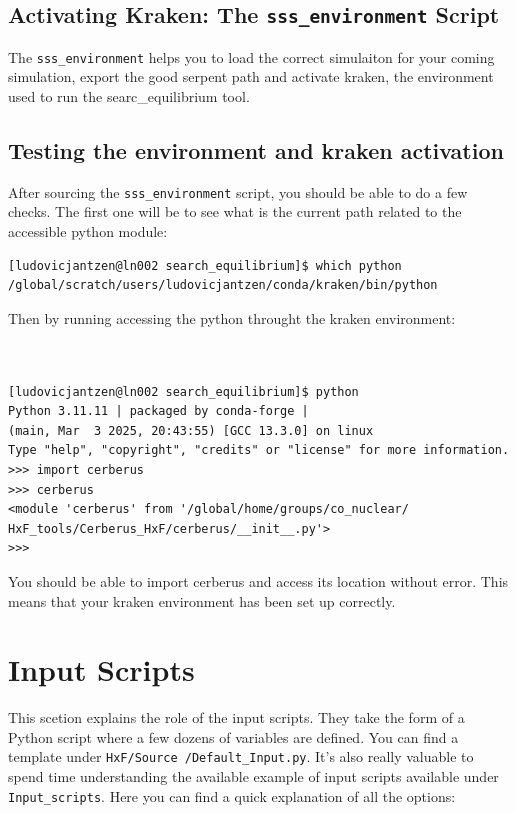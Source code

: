 \documentclass{article}
\begin{document}
\subsection{Activating Kraken: The \texttt{sss\_environment} Script}
The \texttt{sss\_environment} helps you to load the correct simulaiton for your coming simulation, export the good serpent path and activate kraken, the environment used to run the searc\_equilibrium tool.


\subsection{Testing the environment and kraken activation}\label{sec:Cerberus}

After sourcing the \texttt{sss\_environment} script, you should be able to do a few checks. The first one will be to see what is the current path related to the accessible python module: 
\begin{verbatim}
[ludovicjantzen@ln002 search_equilibrium]$ which python
/global/scratch/users/ludovicjantzen/conda/kraken/bin/python
\end{verbatim}

Then by running accessing the python throught the kraken environment: 

\begin{verbatim}
    

[ludovicjantzen@ln002 search_equilibrium]$ python
Python 3.11.11 | packaged by conda-forge |
(main, Mar  3 2025, 20:43:55) [GCC 13.3.0] on linux
Type "help", "copyright", "credits" or "license" for more information.
>>> import cerberus
>>> cerberus
<module 'cerberus' from '/global/home/groups/co_nuclear/
HxF_tools/Cerberus_HxF/cerberus/__init__.py'>
>>> 
\end{verbatim}
You should be able to import cerberus and access its location without error. This means that your kraken environment has been set up correctly.
\newpage
\section{Input Scripts}\label{sec:input_script}
This scetion explains the role of the input scripts. They take the form of a Python script where a few dozens of variables are defined. You can find a template under \texttt{HxF/Source
/Default\_Input.py}. It's also really valuable to spend time understanding the available example of input scripts available under \texttt{Input\_scripts}. Here you can find a quick explanation of all the options: 
\end{document}
